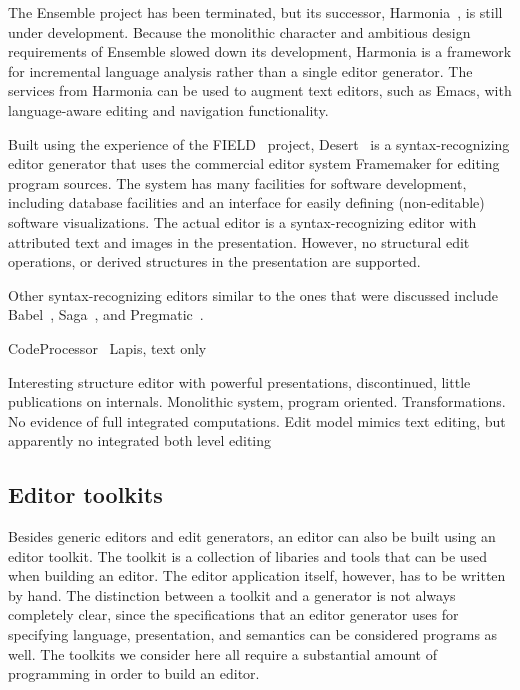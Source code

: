 The Ensemble project has been terminated, but its successor, Harmonia~\cite{boshernitsan01harmonia}, is still under development. Because the monolithic character and ambitious design requirements of Ensemble slowed down its development, Harmonia is a framework for incremental language analysis rather than a single editor generator. The services from Harmonia can be used to augment text editors, such as Emacs, with language-aware editing and navigation functionality.


Built using the experience of the FIELD~\cite{reiss94field} project, Desert~\cite{reiss99desert} is a syntax-recognizing editor generator that uses the commercial editor system Framemaker for editing program sources. The system has many facilities for software development, including database facilities and an interface for easily defining (non-editable) software visualizations. The actual editor is a syntax-recognizing editor with attributed text and images in the presentation. However, no structural edit operations, or derived structures in the presentation are supported.


Other syntax-recognizing editors similar to the ones that were discussed include  Babel~\cite{horton81babel}, Saga~\cite{campbell84saga}, and Pregmatic~\cite{brand92pregmatic}.



\bc
CodeProcessor~\cite{codeprocessor}
Lapis, text only

Interesting structure editor with powerful presentations, discontinued, little publications on
internals. Monolithic system, program oriented. Transformations. No evidence of full 
integrated computations. Edit model mimics text editing, but apparently no integrated
both level editing
\ec


%																
\subsection {Editor toolkits} \label{sect:toolkits}

Besides generic editors and edit generators, an editor can also be built using an editor toolkit. The toolkit is a collection of libaries and tools that can be used when building an editor. The editor application itself, however, has to be written by hand. The distinction between a toolkit and a generator is not always completely clear, since the specifications that an editor generator uses for specifying language, presentation, and semantics can be considered programs as well. The toolkits we consider here all require a substantial amount of programming in order to build an editor.

